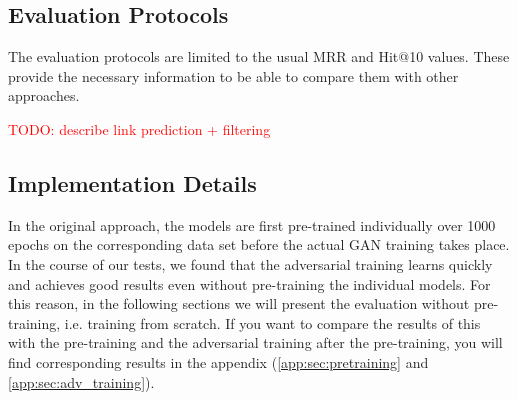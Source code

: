 \subsection{Evaluation Protocols}

The evaluation protocols are limited to the usual MRR and  Hit@10 values.
These provide the necessary information to be able to compare them with other approaches.


\textcolor{red}{TODO: describe link prediction + filtering}

\subsection{Implementation Details}
In the original \kbgan approach, the models are first pre-trained individually over 1000 epochs on the corresponding data set before the actual \ac{GAN} training takes place.
In the course of our tests, we found that the adversarial training learns quickly and achieves good results even without pre-training the individual models.
For this reason, in the following sections we will present the evaluation without pre-training, i.e. training from scratch.
If you want to compare the results of this with the pre-training and the adversarial training after the pre-training, you will find corresponding results in the appendix (\autoref{app:sec:pretraining} and \ref{app:sec:adv_training}).


